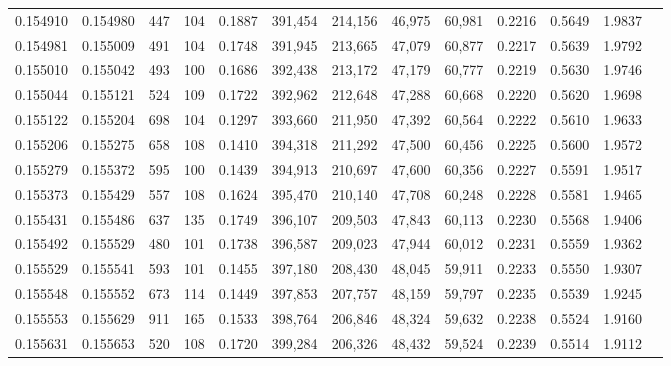 \begin{tabular}{rrrrrrrrrrrrr}
0.154910 & 0.154980 &   447 & 104 &                                     0.1887 & 391,454 & 214,156 &  46,975 &  60,981 & 0.2216 & 0.5649 & 1.9837 \\
0.154981 & 0.155009 &   491 & 104 &                                     0.1748 & 391,945 & 213,665 &  47,079 &  60,877 & 0.2217 & 0.5639 & 1.9792 \\
0.155010 & 0.155042 &   493 & 100 &                                     0.1686 & 392,438 & 213,172 &  47,179 &  60,777 & 0.2219 & 0.5630 & 1.9746 \\
0.155044 & 0.155121 &   524 & 109 &                                     0.1722 & 392,962 & 212,648 &  47,288 &  60,668 & 0.2220 & 0.5620 & 1.9698 \\
0.155122 & 0.155204 &   698 & 104 &                                     0.1297 & 393,660 & 211,950 &  47,392 &  60,564 & 0.2222 & 0.5610 & 1.9633 \\
0.155206 & 0.155275 &   658 & 108 &                                     0.1410 & 394,318 & 211,292 &  47,500 &  60,456 & 0.2225 & 0.5600 & 1.9572 \\
0.155279 & 0.155372 &   595 & 100 &                                     0.1439 & 394,913 & 210,697 &  47,600 &  60,356 & 0.2227 & 0.5591 & 1.9517 \\
0.155373 & 0.155429 &   557 & 108 &                                     0.1624 & 395,470 & 210,140 &  47,708 &  60,248 & 0.2228 & 0.5581 & 1.9465 \\
0.155431 & 0.155486 &   637 & 135 &                                     0.1749 & 396,107 & 209,503 &  47,843 &  60,113 & 0.2230 & 0.5568 & 1.9406 \\
0.155492 & 0.155529 &   480 & 101 &                                     0.1738 & 396,587 & 209,023 &  47,944 &  60,012 & 0.2231 & 0.5559 & 1.9362 \\
0.155529 & 0.155541 &   593 & 101 &                                     0.1455 & 397,180 & 208,430 &  48,045 &  59,911 & 0.2233 & 0.5550 & 1.9307 \\
0.155548 & 0.155552 &   673 & 114 &                                     0.1449 & 397,853 & 207,757 &  48,159 &  59,797 & 0.2235 & 0.5539 & 1.9245 \\
0.155553 & 0.155629 &   911 & 165 &                                     0.1533 & 398,764 & 206,846 &  48,324 &  59,632 & 0.2238 & 0.5524 & 1.9160 \\
0.155631 & 0.155653 &   520 & 108 &                                     0.1720 & 399,284 & 206,326 &  48,432 &  59,524 & 0.2239 & 0.5514 & 1.9112 \\

\end{tabular}
